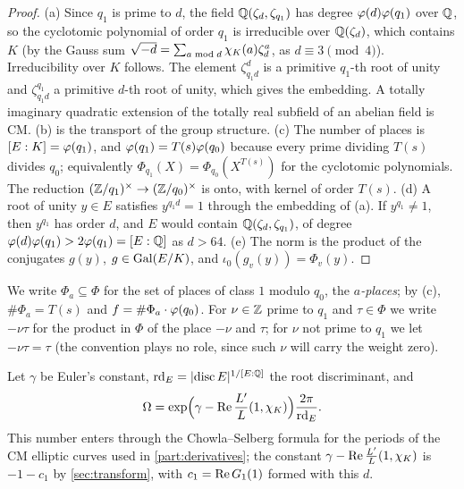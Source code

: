 \begin{proof}
(a) Since $q_1$ is prime to $d$, the field $\mathbb{Q}(\zeta_d,\zeta_{q_1})$ has degree $\varphi(d)\varphi(q_1)$
over $\mathbb{Q}$, so the cyclotomic polynomial of order $q_1$ is irreducible over $\mathbb{Q}(\zeta_d)$, which
contains $K$ (by the Gauss sum $\sqrt{-d}=\sum_{a\bmod d}\chi_K(a)\zeta_d^a$, as $d\equiv3\pmod4$).
Irreducibility over $K$ follows. The element $\zeta_{q_1d}^d$ is a primitive $q_1$-th root of unity
and $\zeta_{q_1d}^{q_1}$ a primitive $d$-th root of unity, which gives the embedding. A totally
imaginary quadratic extension of the totally real subfield of an abelian field is CM.
(b) is the transport of the group structure. (c) The number of places is
$[E:K]=\varphi(q_1)$, and $\varphi(q_1)=T(s)\varphi(q_0)$ because every prime dividing $T(s)$
divides $q_0$; equivalently $\Phi_{q_1}(X)=\Phi_{q_0}(X^{T(s)})$ for the cyclotomic polynomials.
The reduction $(\mathbb{Z}/q_1)^\times\to(\mathbb{Z}/q_0)^\times$ is onto, with kernel of order $T(s)$.
(d) A root of unity $y\in E$ satisfies $y^{q_1d}=1$ through the embedding of (a). If $y^{q_1}\neq1$,
then $y^{q_1}$ has order $d$, and $E$ would contain $\mathbb{Q}(\zeta_d,\zeta_{q_1})$, of degree
$\varphi(d)\varphi(q_1)>2\varphi(q_1)=[E:\mathbb{Q}]$ as $d>64$. (e) The norm is the product of the
conjugates $g(y)$, $g\in\operatorname{Gal}(E/K)$, and $\iota_0(g_v(y))=\Phi_v(y)$.
\end{proof}

We write $\Phi_a\subseteq\Phi$ for the set of places of class $1$ modulo $q_0$, the
\emph{$a$-places}; by (c), $\#\Phi_a=T(s)$ and $f=\#\Phi_a\cdot\varphi(q_0)$. For $\nu\in\mathbb{Z}$ prime to
$q_1$ and $\tau\in\Phi$ we write $-\nu\tau$ for the product in $\Phi$ of the place $-\nu$ and
$\tau$; for $\nu$ not prime to $q_1$ we let $-\nu\tau=\tau$ (the convention plays no role, since such
$\nu$ will carry the weight zero).

Let $\gamma$ be Euler's constant, $\mathrm{rd}_E=\lvert \operatorname{disc} E\rvert^{1/[E:\mathbb{Q}]}$ the root discriminant, and
\begin{equation}\label{eq:Omega}
  \Omega=\exp\Bigl(\gamma-\operatorname{Re}\frac{L'}{L}(1,\chi_K)\Bigr)\frac{2\pi}{\mathrm{rd}_E}.
\end{equation}
This number enters through the Chowla--Selberg formula for the periods of the CM elliptic curves
used in \cref{part:derivatives}; the constant $\gamma-\operatorname{Re}\frac{L'}{L}(1,\chi_K)$ is $-1-c_1$ by
\cref{sec:transform}, with $c_1=\operatorname{Re} G_1(1)$ formed with this $d$.

